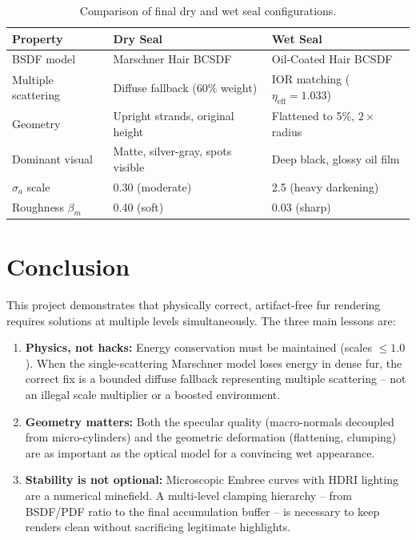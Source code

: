 \documentclass[11pt]{article}
\begin{document}
\begin{table}[H]
\centering
\begin{tabular}{lll}
\toprule
\textbf{Property} & \textbf{Dry Seal} & \textbf{Wet Seal} \\
\midrule
BSDF model          & Marschner Hair BCSDF             & Oil-Coated Hair BCSDF \\
Multiple scattering & Diffuse fallback (60\% weight)   & IOR matching ($\eta_\text{eff} = 1.033$) \\
Geometry            & Upright strands, original height & Flattened to 5\%, $2\times$ radius \\
Dominant visual     & Matte, silver-gray, spots visible & Deep black, glossy oil film \\
$\sigma_a$ scale    & 0.30 (moderate)                  & 2.5 (heavy darkening) \\
Roughness $\beta_m$ & 0.40 (soft)                      & 0.03 (sharp) \\
\bottomrule
\end{tabular}
\caption{Comparison of final dry and wet seal configurations.}
\label{tab:comparison}
\end{table}

\section{Conclusion}

This project demonstrates that physically correct, artifact-free fur rendering requires solutions at multiple levels simultaneously. The three main lessons are:

\begin{enumerate}
    \item \textbf{Physics, not hacks:} Energy conservation must be maintained (scales $\leq 1.0$). When the single-scattering Marschner model loses energy in dense fur, the correct fix is a bounded diffuse fallback representing multiple scattering -- not an illegal scale multiplier or a boosted environment.
    \item \textbf{Geometry matters:} Both the specular quality (macro-normals decoupled from micro-cylinders) and the geometric deformation (flattening, clumping) are as important as the optical model for a convincing wet appearance.
    \item \textbf{Stability is not optional:} Microscopic Embree curves with HDRI lighting are a numerical minefield. A multi-level clamping hierarchy -- from BSDF/PDF ratio to the final accumulation buffer -- is necessary to keep renders clean without sacrificing legitimate highlights.
\end{enumerate}
\end{document}
